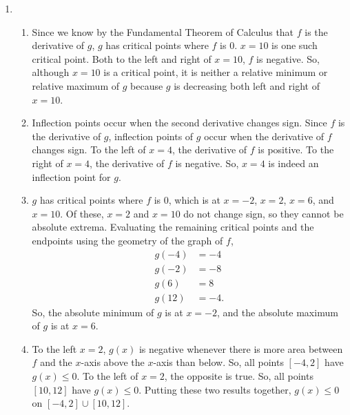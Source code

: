 \begin{enumerate}
	\item \begin{enumerate}
		\item Since we know by the Fundamental Theorem of Calculus that $f$ is the derivative of $g$, $g$ has critical points where $f$ is 0.
			$x=10$ is one such critical point.
			Both to the left and right of $x=10$, $f$ is negative.
			So, although $x=10$ is a critical point, it is neither a relative minimum or relative maximum of $g$ because $g$ is decreasing both left and right of $x=10$.
		\item Inflection points occur when the second derivative changes sign.
			Since $f$ is the derivative of $g$, inflection points of $g$ occur when the derivative of $f$ changes sign.
			To the left of $x=4$, the derivative of $f$ is positive.
			To the right of $x=4$, the derivative of $f$ is negative.
			So, $x=4$ is indeed an inflection point for $g$.
		\item $g$ has critical points where $f$ is 0, which is at $x=-2$, $x=2$, $x=6$, and $x=10$.
			Of these, $x=2$ and $x=10$ do not change sign, so they cannot be absolute extrema.
			Evaluating the remaining critical points and the endpoints using the geometry of the graph of $f$,
			\begin{align*}
				g(-4) &= -4 \\
				g(-2) &= -8 \\
				g(6) &= 8 \\
				g(12) &= -4.
			\end{align*}
			So, the absolute minimum of $g$ is at $x=-2$, and the absolute maximum of $g$ is at $x=6$.
		\item To the left $x=2$, $g(x)$ is negative whenever there is more area between $f$ and the $x$-axis above the $x$-axis than below.
			So, all points $[-4,2]$ have $g(x) \leq 0$.
			To the left of $x=2$, the opposite is true.
			So, all points $[10,12]$ have $g(x) \leq 0$.
			Putting these two results together, $g(x) \leq 0$ on $[-4,2] \cup [10,12]$. 
	\end{enumerate}


\end{enumerate}
